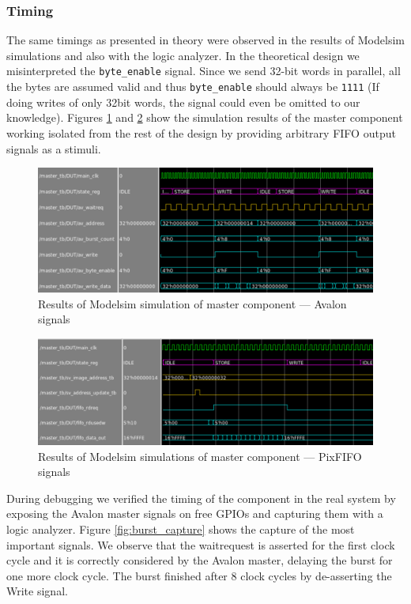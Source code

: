 \documentclass{article}
\begin{document}
\subsubsection{Timing}

The same timings as presented in theory were observed in the results of Modelsim simulations and also with the logic analyzer. In the theoretical design we misinterpreted the \verb'byte_enable' signal. Since we send 32-bit words in parallel, all the bytes are assumed valid and thus \verb'byte_enable' should always  be \verb'1111' (If doing writes of only 32bit words, the signal could even be omitted to our knowledge). Figures \ref{fig:MasterAvalonTiming} and \ref{fig:MasterFifoTiming} show the simulation results of the master component working isolated from the rest of the design by providing arbitrary FIFO output signals as a stimuli.
\begin{figure}[H]
\centering
\includegraphics[scale=0.65]{images/MasterAvalonTiming.png}
\caption{Results of Modelsim simulation of master component --- Avalon signals}
\label{fig:MasterAvalonTiming}
\end{figure}

\begin{figure}[H]
\centering
\includegraphics[scale=0.62]{images/MasterFifoTiming.png}
\caption{Results of Modelsim simulations of master component --- PixFIFO signals}
\label{fig:MasterFifoTiming}
\end{figure}

During debugging we verified the timing of the component in the real system by exposing the Avalon master signals on free GPIOs and capturing them with a logic analyzer.
Figure \ref{fig:burst_capture} shows the capture of the most important signals. We observe that the waitrequest is asserted for the first clock cycle and it is correctly considered by the Avalon master, delaying the burst for one more clock cycle. The burst finished after 8 clock cycles by de-asserting the Write signal.
\end{document}
